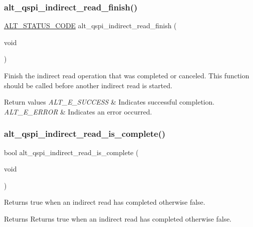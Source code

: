 \subsubsection{\texorpdfstring{alt\_qspi\_indirect\_read\_finish()}{alt\_qspi\_indirect\_read\_finish()}}
{\footnotesize\ttfamily \mbox{\hyperlink{hwlib_8h_abdb0d369f069723ca55d6c94bcaaaa12}{A\+L\+T\+\_\+\+S\+T\+A\+T\+U\+S\+\_\+\+C\+O\+DE}} alt\+\_\+qspi\+\_\+indirect\+\_\+read\+\_\+finish (\begin{DoxyParamCaption}\item[{void}]{ }\end{DoxyParamCaption})}

Finish the indirect read operation that was completed or canceled. This function should be called before another indirect read is started.


\begin{DoxyRetVals}{Return values}
{\em A\+L\+T\+\_\+\+E\+\_\+\+S\+U\+C\+C\+E\+SS} & Indicates successful completion. \\
\hline
{\em A\+L\+T\+\_\+\+E\+\_\+\+E\+R\+R\+OR} & Indicates an error occurred. \\
\hline
\end{DoxyRetVals}
\mbox{\label{group__ALT__QSPI__INDAC_ga7199629817c34345d00da8c5c09493f7}} 
\subsubsection{\texorpdfstring{alt\_qspi\_indirect\_read\_is\_complete()}{alt\_qspi\_indirect\_read\_is\_complete()}}
{\footnotesize\ttfamily bool alt\+\_\+qspi\+\_\+indirect\+\_\+read\+\_\+is\+\_\+complete (\begin{DoxyParamCaption}\item[{void}]{ }\end{DoxyParamCaption})}

Returns true when an indirect read has completed otherwise false.

\begin{DoxyReturn}{Returns}
Returns true when an indirect read has completed otherwise false. 
\end{DoxyReturn}
\mbox{\label{group__ALT__QSPI__INDAC_ga1249afce923d78b6515d22b5190cf4ea}} 
